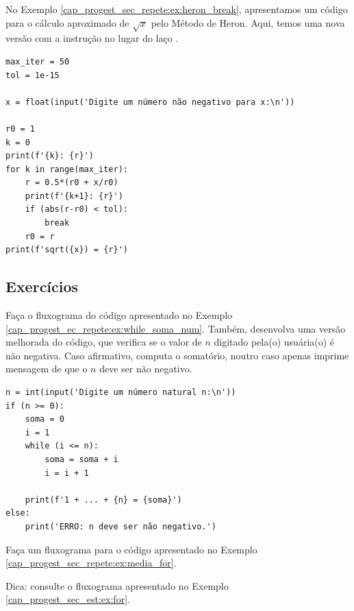 \begin{ex}
  No Exemplo \ref{cap_progest_sec_repete:ex:heron_break}, apresentamos um código para o cálculo aproximado de $\sqrt{x}$ pelo Método de Heron. Aqui, temos uma nova versão com a instrução {\PYTHONfor} no lugar do laço {\PYTHONwhile}.

\begin{lstlisting}
max_iter = 50
tol = 1e-15

x = float(input('Digite um número não negativo para x:\n'))

r0 = 1
k = 0
print(f'{k}: {r}')
for k in range(max_iter):
    r = 0.5*(r0 + x/r0)
    print(f'{k+1}: {r}')
    if (abs(r-r0) < tol):
        break
    r0 = r
print(f'sqrt({x}) = {r}')
\end{lstlisting}

\end{ex}

\subsection{Exercícios}

\begin{exer}
  Faça o fluxograma do código apresentado no Exemplo \ref{cap_progest_ec_repete:ex:while_soma_num}. Também, desenvolva uma versão melhorada do código, que verifica se o valor de $n$ digitado pela(o) usuária(o) é não negativa. Caso afirmativo, computa o somatório, noutro caso apenas imprime mensagem de que o $n$ deve ser não negativo.
\end{exer}
\begin{resp}

\begin{lstlisting}
n = int(input('Digite um número natural n:\n'))
if (n >= 0):
    soma = 0
    i = 1
    while (i <= n):
        soma = soma + i
        i = i + 1

    print(f'1 + ... + {n} = {soma}')
else:
    print('ERRO: n deve ser não negativo.')
\end{lstlisting}

\end{resp}

\begin{exer}
  Faça um fluxograma para o código apresentado no Exemplo \ref{cap_progest_sec_repete:ex:media_for}.
\end{exer}
\begin{resp}
  Dica: consulte o fluxograma apresentado no Exemplo \ref{cap_progest_sec_est:ex:for}.
\end{resp}

